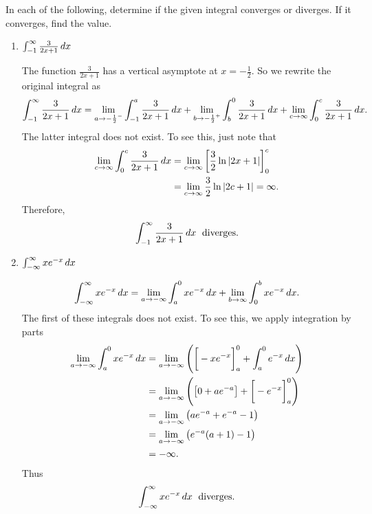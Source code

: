 \documentclass[]{ximera}
\begin{document}
\begin{instructorNotes}

\end{instructorNotes}








\begin{problem}
In each of the following, determine if the given integral converges or diverges.  
If it converges, find the value.

	\begin{enumerate}
	
	\item  $\int_{-1}^{\infty} \frac{3}{2x+1} \,d x$
	\begin{freeResponse}
	The function $\frac{3}{2x+1}$ has a vertical asymptote at $x=- \frac{1}{2}$.  
	So we rewrite the original integral as
		\[
		\int_{-1}^{\infty} \frac{3}{2x+1} \d x = \lim_{a \to -\frac{1}{2}^-} \int_{-1}^a \frac{3}{2x+1} \d x  
		+ \lim_{b \to -\frac{1}{2}^+} \int_b^0 \frac{3}{2x+1} \d x + \lim_{c \to \infty} \int_0^c \frac{3}{2x+1} \d x.
		\]
	The latter integral does not exist.  
	To see this, just note that
		\begin{align*}
		 \lim_{c \to \infty} \int_0^c \frac{3}{2x+1} \d x 
		 &= \lim_{c \to \infty} \eval{\frac{3}{2} \ln|2x+1|}_0^c  \\
		 &= \lim_{c \to \infty} \frac{3}{2} \ln|2c+1| = \infty.
		\end{align*}
	Therefore, 
		\[
		\int_{-1}^{\infty} \frac{3}{2x+1} \,d x \; \text{ diverges.}
		\]
	\end{freeResponse}
	
	
	
	\item  $\int_{-\infty}^{\infty} x e^{-x} \,d x$
	\begin{freeResponse}
	\[
	\int_{-\infty}^{\infty} x e^{-x} \d x = \lim_{a \to -\infty} \int_a^0 xe^{-x} \d x + \lim_{b \to \infty} \int_0^b xe^{-x} \d x.
	\]
	The first of these integrals does not exist.  
	To see this, we apply integration by parts
		\begin{align*}
		\lim_{a \to -\infty} \int_a^0 xe^{-x} \d x
		&= \lim_{a \to -\infty} \left( \eval{-xe^{-x}}_a^0 + \int_a^0 e^{-x} \d x \right)  \\
		&= \lim_{a \to -\infty} \left( \left[ 0 + ae^{-a} \right] + \eval{-e^{-x}}_a^0 \right)  \\
		&= \lim_{a \to -\infty} \left( ae^{-a} + e^{-a} - 1 \right)  \\
		&= \lim_{a \to -\infty} \left( e^{-a}(a+1) - 1 \right)  \\
		&= - \infty.
		\end{align*}
	Thus
		\[
		\int_{-\infty}^{\infty} x e^{-x} \,d x \; \text{ diverges.}
		\]
	\end{freeResponse}
	

\end{enumerate}
\end{problem}
\end{document}
